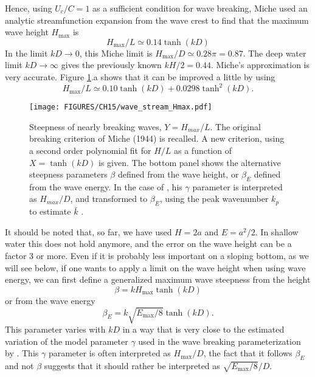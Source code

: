 Hence, using $U_c/C = 1$ as a sufficient condition for wave breaking, 
Miche used an analytic streamfunction expansion from the wave crest to find that the maximum wave height $H_{\max}$ is 
\begin{equation}
 H_{\max}/L \simeq 0.14 \tanh(kD)
\end{equation}
In the limit $kD \rightarrow 0$, this Miche limit is $H_{\max}/D\simeq 0.28 \pi = 0.87$. The deep water limit $kD \rightarrow \infty$ gives the 
previously known $kH/2 = 0.44$.  Miche's approximation is very accurate.  Figure \ref{fig:STREAM}.a shows that it can be improved a little by using  
\begin{equation}
 H_{\max}/L \simeq 0.10 \tanh(kD)+ 0.0298 \tanh^2(kD).
\end{equation}
\begin{figure}[htb]
 \vspace{9pt}
\centerline{\texttt{[image: FIGURES/CH15/wave\_stream\_Hmax.pdf]}}
 \caption{Steepness of nearly breaking waves, $Y=H_{max}/L$. The original breaking criterion of Miche (1944) is recalled. 
 A new
 criterion, using a second order polynomial fit for $H/L$ as a function of $X=\tanh(kD)$ is given. 
 The bottom panel shows the alternative
 steepness parameters $\beta$ defined from the wave height, or $\beta_E$ defined from the wave energy. In the case of \cite{Ruessink&al.2003}, his $\gamma$ parameter 
 is interpreted as $H_{max}/D$, and transformed to $\beta_{E}$, using the peak wavenumber $k_p$ to estimate $\bar{k}$ 
 \citep[adapted from ][]{Filipot&al.2010}.}
 \label{fig:STREAM}
\end{figure}
It should be noted that, so far, we have used $H=2a$ and $E=a^2/2$. In shallow water this does not hold anymore, and the error on the wave 
height can be a factor 3 or more. Even if it is probably less important on a sloping bottom, as we will see below, if one wants to apply a limit on the wave 
height when using wave energy, we can first define
a generalized maximum wave steepness from the height 
\begin{equation}
 \beta = k H_{\max} \tanh(kD)
\end{equation}
or from the wave energy 
\begin{equation}
 \beta_{E} = k \sqrt{E_{\max} / 8} \tanh(kD).
\end{equation}
This parameter varies with $kD$ in a way that is very close to the estimated variation of the model parameter $\gamma$ used in the wave 
breaking parameterization by \cite{Ruessink&al.2003}. This $\gamma$ parameter is often interpreted as $H_{\max}/D$, the fact that it 
follows $\beta_E$ and not $\beta$ suggests that it should rather be interpreted as $\sqrt{E_{\max} / 8}/D$. 

